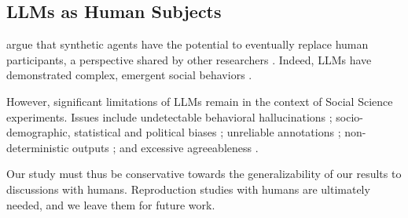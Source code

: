 \subsection{LLMs as Human Subjects}
\label{ssec:related:human-llm}

\citet{grossman_2023} argue that synthetic agents have the potential to eventually replace human participants, a perspective shared by other researchers \cite{tornberg_2023, argyle2023}. Indeed, \acp{LLM} have demonstrated complex, emergent social behaviors \cite{Park2023GenerativeAI, demarzo_2023, leng_2024, abdelnabi_negotiations, abramski_2023, hewitt2024predicting, park2024generativeagentsimulations1000}.

However, significant limitations of \acp{LLM} remain in the context of Social Science experiments. Issues include undetectable behavioral hallucinations \cite{rossi_2024}; socio-demographic, statistical and political biases \cite{anthis_2025,hewitt2024predicting,rossi_2024, Taubenfeld2024SystematicBI}; unreliable annotations \cite{jansen_2023,bisbee_2023,neumann_2025, Gligoric2024CanUL}; non-deterministic outputs \cite{atil_2025, bisbee_2023}; and excessive agreeableness \cite{Park2023GenerativeAI, anthis_2025, rossi_2024}.

Our study must thus be conservative towards the generalizability of our results to discussions with humans. Reproduction studies with humans are ultimately needed, and we leave them for future work.




